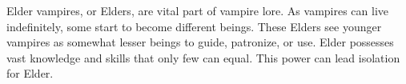Elder vampires, or Elders, are vital part of vampire lore.
As vampires can live indefinitely, some start to become different beings.
These Elders see younger vampires as somewhat lesser beings to guide, patronize, or use.
Elder possesses vast knowledge and skills that only few can equal.
This power can lead isolation for Elder.






\pagebreak
